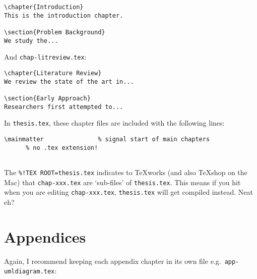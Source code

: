 \begin{lstlisting}[moretexcs={chapter}]
%!TEX ROOT=thesis.tex
\chapter{Introduction}
This is the introduction chapter.

\section{Problem Background}
We study the...
\end{lstlisting}

\bigskip

And \texttt{chap-litreview.tex}:
\begin{lstlisting}[moretexcs={chapter}]
%!TEX ROOT=thesis.tex
\chapter{Literature Review}
We review the state of the art in...

\section{Early Approach}
Researchers first attempted to...
\end{lstlisting}

\bigskip

In \texttt{thesis.tex}, these chapter files are included with the following lines:
\begin{lstlisting}[keepspaces=true,moretexcs=mainmatter]
\mainmatter               % signal start of main chapters
      % no .tex extension!


\end{lstlisting}

\bigskip

The \lstinline|%!TEX ROOT=thesis.tex| 
indicates to \textsf{TeXworks} (and also \textsf{TeXshop} on the Mac) that \texttt{chap-xxx.tex} are `sub-files' of \texttt{thesis.tex}. This means if you hit  when you  are editing \texttt{chap-xxx.tex}, \texttt{thesis.tex} will get compiled instead. Neat eh?


\section{Appendices}\label{sec:appendices}
Again, I recommend keeping each appendix chapter in its own file e.g.~\texttt{app-umldiagram.tex}:

